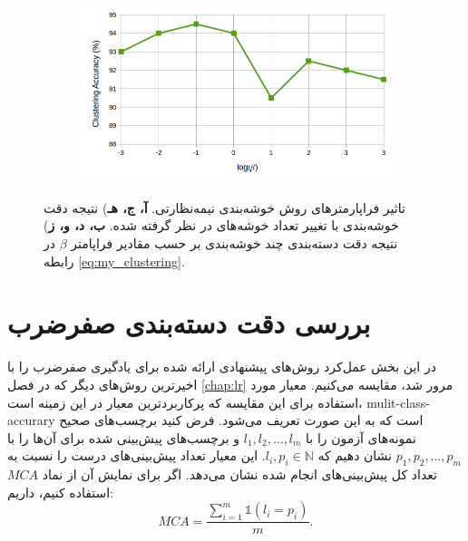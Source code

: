 \begin{figure}[!h]
\begin{subfigure}[b]{0.43\linewidth}
    \caption{}
  \end{subfigure}
    \begin{subfigure}[b]{0.43\linewidth}
    \includegraphics[width=\linewidth]{images/cluster_beta_sun}
    \caption{}
  \end{subfigure}
%
  \caption[تحلیل فراپارامترهای روش یادگیری نگاشت و خوشه‌بندی توام]{
  تاثیر فراپارمترهای  روش خوشه‌بندی نیمه‌نظارتی.  
\textbf{آ، ج، هـ}) 
  نتیجه دقت خوشه‌بندی با تغییر تعداد خوشه‌های در نظر گرفته شده.
 \textbf{ب، د، و، ز})
 نتیجه دقت  دسته‌بندی چند خوشه‌بندی بر حسب مقادیر فراپامتر $\beta$ در رابطه \eqref{eq:my_clustering}.
 }
  \label{fig:cluster_params}
  \end{figure}


\section{بررسی دقت دسته‌بندی صفرضرب}\label{exp:comp}
در این بخش عمل‌کرد روش‌های پیشنهادی ارائه شده برای یادگیری صفرضرب را با اخیرترین روش‌های دیگر که در فصل \ref{chap:lr} مرور شد، مقایسه می‌کنیم. معیار مورد استفاده برای این مقایسه که پرکاربردترین معیار در این زمینه است، \gls{mulit-class-accurary} است که به این صورت تعریف می‌شود. فرض کنید برچسب‌های صحیح نمونه‌های آزمون را با
$l_1, l_2, \ldots, l_m$
و  برچسب‌های پیش‌بینی شده برای آن‌ها را با
$p_1, p_2, \ldots, p_m$
نشان دهیم که
$l_i, p_i \in \mathbb{N}$.
این معیار تعداد پیش‌بینی‌های درست را نسبت به تعداد کل پیش‌بینی‌های انجام شده نشان می‌دهد. اگر برای نمایش آن از نماد $MCA$ استفاده کنیم، داریم:
\begin{equation}
MCA = \frac{\sum_{i=1}^m \mathds{1}(l_i = p_i)}{m}.
\end{equation}
